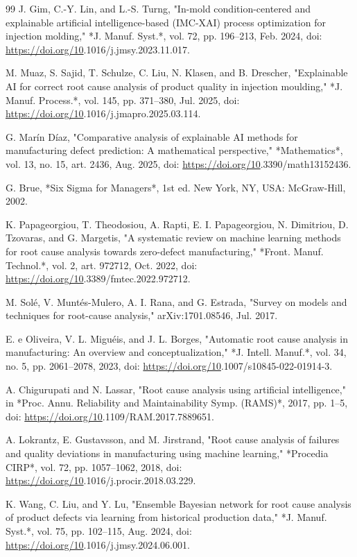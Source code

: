 \begin{thebibliography}{99}
 J. Gim, C.-Y. Lin, and L.-S. Turng, "In-mold condition-centered and explainable artificial intelligence-based (IMC-XAI) process optimization for injection molding," *J. Manuf. Syst.*, vol. 72, pp. 196–213, Feb. 2024, doi: \url{https://doi.org/10}.1016/j.jmsy.2023.11.017.

 M. Muaz, S. Sajid, T. Schulze, C. Liu, N. Klasen, and B. Drescher, "Explainable AI for correct root cause analysis of product quality in injection moulding," *J. Manuf. Process.*, vol. 145, pp. 371–380, Jul. 2025, doi: \url{https://doi.org/10}.1016/j.jmapro.2025.03.114.

 G. Marín Díaz, "Comparative analysis of explainable AI methods for manufacturing defect prediction: A mathematical perspective," *Mathematics*, vol. 13, no. 15, art. 2436, Aug. 2025, doi: \url{https://doi.org/10}.3390/math13152436.

 G. Brue, *Six Sigma for Managers*, 1st ed. New York, NY, USA: McGraw-Hill, 2002.

 K. Papageorgiou, T. Theodosiou, A. Rapti, E. I. Papageorgiou, N. Dimitriou, D. Tzovaras, and G. Margetis, "A systematic review on machine learning methods for root cause analysis towards zero-defect manufacturing," *Front. Manuf. Technol.*, vol. 2, art. 972712, Oct. 2022, doi: \url{https://doi.org/10}.3389/fmtec.2022.972712.

 M. Solé, V. Muntés-Mulero, A. I. Rana, and G. Estrada, "Survey on models and techniques for root-cause analysis," arXiv:1701.08546, Jul. 2017.

 E. e Oliveira, V. L. Miguéis, and J. L. Borges, "Automatic root cause analysis in manufacturing: An overview and conceptualization," *J. Intell. Manuf.*, vol. 34, no. 5, pp. 2061–2078, 2023, doi: \url{https://doi.org/10}.1007/s10845-022-01914-3.

 A. Chigurupati and N. Lassar, "Root cause analysis using artificial intelligence," in *Proc. Annu. Reliability and Maintainability Symp. (RAMS)*, 2017, pp. 1–5, doi: \url{https://doi.org/10}.1109/RAM.2017.7889651.

 A. Lokrantz, E. Gustavsson, and M. Jirstrand, "Root cause analysis of failures and quality deviations in manufacturing using machine learning," *Procedia CIRP*, vol. 72, pp. 1057–1062, 2018, doi: \url{https://doi.org/10}.1016/j.procir.2018.03.229.

 K. Wang, C. Liu, and Y. Lu, "Ensemble Bayesian network for root cause analysis of product defects via learning from historical production data," *J. Manuf. Syst.*, vol. 75, pp. 102–115, Aug. 2024, doi: \url{https://doi.org/10}.1016/j.jmsy.2024.06.001.


\end{thebibliography}
